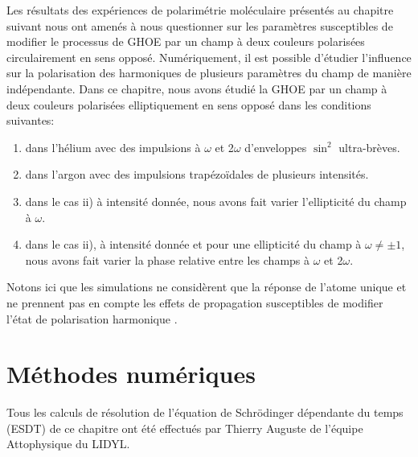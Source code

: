 Les résultats des expériences de polarimétrie moléculaire présentés au chapitre suivant nous ont amenés à nous questionner sur les paramètres susceptibles de modifier le processus de GHOE par un champ à deux couleurs polarisées circulairement en sens opposé. Numériquement, il est possible d'étudier l'influence sur la polarisation des harmoniques de plusieurs paramètres du champ de manière indépendante. Dans ce chapitre, nous avons étudié la GHOE par un champ à deux couleurs polarisées elliptiquement en sens opposé dans les conditions suivantes:
\begin{enumerate}[label=\roman*)]
\item dans l'hélium avec des impulsions à $\omega$ et 2$\omega$ d'enveloppes $\sin^2$ ultra-brèves.
\item dans l'argon avec des impulsions trapézoïdales de plusieurs intensités.
\item dans le cas ii) à intensité donnée, nous avons fait varier l'ellipticité du champ à $\omega$.
\item dans le cas ii), à intensité donnée et pour une ellipticité du champ à $\omega \neq \pm 1$, nous avons fait varier la phase relative entre les champs à $\omega$ et 2$\omega$.
\end{enumerate}
Notons ici que les simulations ne considèrent que la réponse de l'atome unique et ne prennent pas en compte les effets de propagation susceptibles de modifier l'état de polarisation harmonique .

\section{Méthodes numériques}
\label{sec:MethodesNum}
Tous les calculs de résolution de l'équation de Schrödinger dépendante du temps (ESDT) de ce chapitre ont été effectués par Thierry Auguste de l'équipe Attophysique du LIDYL. 

